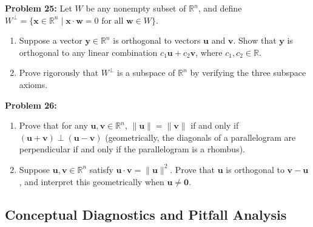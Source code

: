 \documentclass[11pt, letterpaper]{article}
\theoremstyle{definition}
\theoremstyle{remark}
\begin{document}
\textbf{Problem 25:} Let $W$ be any nonempty subset of $\mathbb{R}^n$, and define $W^{\perp} = \{\mathbf{x} \in \mathbb{R}^n \mid \mathbf{x} \cdot \mathbf{w} = 0 \text{ for all } \mathbf{w} \in W\}$.
\begin{enumerate}[label=(\alph*)]
    \item Suppose a vector $\mathbf{y} \in \mathbb{R}^n$ is orthogonal to vectors $\mathbf{u}$ and $\mathbf{v}$. Show that $\mathbf{y}$ is orthogonal to any linear combination $c_1\mathbf{u} + c_2\mathbf{v}$, where $c_1, c_2 \in \mathbb{R}$.
    \item Prove rigorously that $W^{\perp}$ is a subspace of $\mathbb{R}^n$ by verifying the three subspace axioms.
\end{enumerate}

\textbf{Problem 26:}
\begin{enumerate}[label=(\alph*)]
    \item Prove that for any $\mathbf{u}, \mathbf{v} \in \mathbb{R}^n$, $\|\mathbf{u}\| = \|\mathbf{v}\|$ if and only if $(\mathbf{u} + \mathbf{v}) \perp (\mathbf{u} - \mathbf{v})$ (geometrically, the diagonals of a parallelogram are perpendicular if and only if the parallelogram is a rhombus).
    \item Suppose $\mathbf{u}, \mathbf{v} \in \mathbb{R}^n$ satisfy $\mathbf{u} \cdot \mathbf{v} = \|\mathbf{u}\|^2$. Prove that $\mathbf{u}$ is orthogonal to $\mathbf{v} - \mathbf{u}$, and interpret this geometrically when $\mathbf{u} \neq \mathbf{0}$.
\end{enumerate}

\subsection{Conceptual Diagnostics and Pitfall Analysis}
\end{document}
